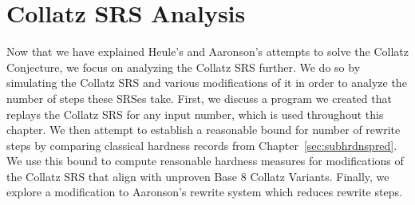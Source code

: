 

\chapter{Collatz SRS Analysis} \label{sec:hardnessrewriterules}
Now that we have explained Heule's and Aaronson's attempts to solve the Collatz Conjecture, we focus on analyzing the Collatz SRS further. We do so by simulating the Collatz SRS and various modifications of it in order to analyze the number of steps these SRSes take. First, we discuss a program we created that replays the Collatz SRS for any input number, which is used throughout this chapter. We then attempt to establish a reasonable bound for number of rewrite steps by comparing classical hardness records from Chapter~\ref{sec:subhrdnspred}. We use this bound to compute reasonable hardness measures for modifications of the Collatz SRS that align with unproven Base 8 Collatz Variants. Finally, we explore a modification to Aaronson's rewrite system which reduces rewrite steps.
